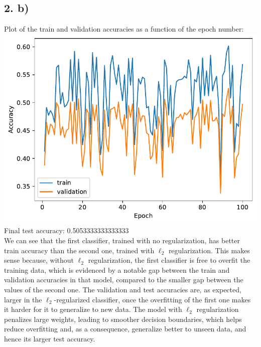 \documentclass[12pt,a4paper]{article}
\begin{document}
    \subsection{2. b)}
        Plot of the train and validation accuracies as a function of the epoch number: \\
        \includegraphics[width=\imagewidth]{q1/q1_2b-accs.pdf} \\
        Final test accuracy: 0.5053333333333333 \\
        We can see that the first classifier, trained with no regularization, has better train accuracy than the second one, trained with \(\ell_2\) regularization. This makes sense because, without \(\ell_2\) regularization, the first classifier is free to overfit the training data, which is evidenced by a notable gap between the train and validation accuracies in that model, compared to the smaller gap between the values of the second one. The validation and test accuracies are, as expected, larger in the \(\ell_2\)-regularized classifier, once the overfitting of the first one makes it harder for it to generalize to new data. The model with \(\ell_2\) regularization penalizes large weights, leading to smoother decision boundaries, which helps reduce overfitting and, as a consequence, generalize better to unseen data, and hence its larger test accuracy.
\end{document}
